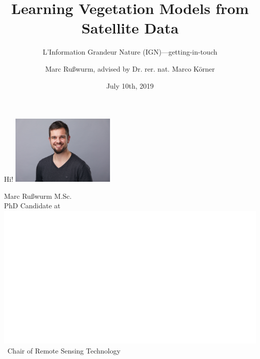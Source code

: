 \documentclass[%
  aspectratio=169,
  9pt,
  USenglish,
  titlegraphic, %
  affiliationintitlepagehead,
  progressbar,
]{beamer}
\title{Learning Vegetation Models from Satellite Data}
\subtitle{L'Information Grandeur Nature (IGN)---getting-in-touch}
\author[M. Rußwurm]{Marc Rußwurm, advised by Dr. rer. nat. Marco Körner}
\institute[TUM]{Technical University of Munich, Germany\\
                Remote Sensing Technology}
\date{July 10th, 2019}
\begin{document}
\begin{frame}[t]
  \titlepage
\end{frame}


{
	\begin{frame}[plain]
	\vfill
	\begin{center}
		\Huge\color{black}
		Hi!
		\hspace{2em}\includegraphics[width=5cm]{images/marc}
		\vspace{2em}
		
		\Large\raggedright
		
		Marc Rußwurm M.Sc. \\
		\vspace{1em}
		PhD Candidate at~\includegraphics[height=.9em]{images/TUM-white}~Chair of Remote Sensing Technology
	\end{center}
	\vfill
\end{frame}
}
\end{document}
